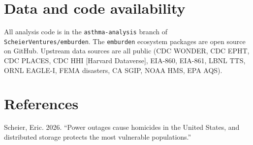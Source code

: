 \documentclass[
]{article}
\newlength{\cslhangindent}
\newlength{\cslentryspacingunit} %
\newenvironment{CSLReferences}[2] %
 {%
  \setlength{\parindent}{0pt}
  \ifodd #1
  \let\oldpar\par
  \def\par{\hangindent=\cslhangindent\oldpar}
  \fi
  \setlength{\parskip}{#2\cslentryspacingunit}
 }%
 {}
\begin{document}
\hypertarget{data-and-code-availability}{%
\section{Data and code availability}\label{data-and-code-availability}}

All analysis code is in the \texttt{asthma-analysis} branch of
\texttt{ScheierVentures/emburden}. The \texttt{emburden} ecosystem
packages are open source on GitHub. Upstream data sources are all public
(CDC WONDER, CDC EPHT, CDC PLACES, CDC HHI {[}Harvard Dataverse{]},
EIA-860, EIA-861, LBNL TTS, ORNL EAGLE-I, FEMA disasters, CA SGIP, NOAA
HMS, EPA AQS).

\hypertarget{references}{%
\section*{References}\label{references}}

\hypertarget{refs}{}
\begin{CSLReferences}{1}{0}
\leavevmode{}%
Scheier, Eric. 2026. {``{Power outages cause homicides in the United
States, and distributed storage protects the most vulnerable
populations}.''}

\end{CSLReferences}
\end{document}
